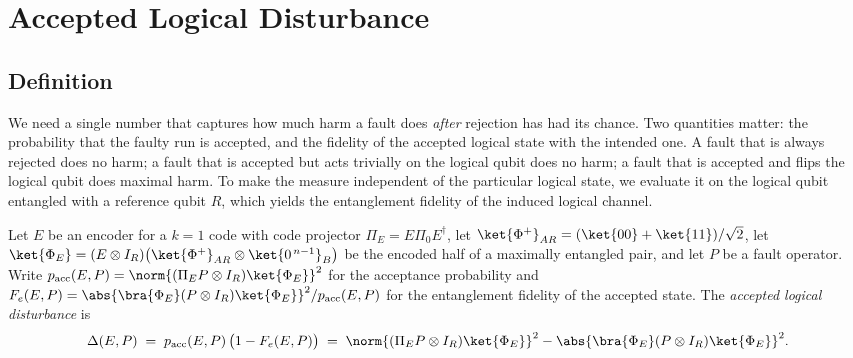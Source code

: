 \section{Accepted Logical Disturbance}\label{sec:qec:disturbance}

\subsection{Definition}\label{sec:qec:definition}

We need a single number that captures how much harm a fault does \emph{after} rejection has had its chance. Two quantities matter: the probability that the faulty run is accepted, and the fidelity of the accepted logical state with the intended one. A fault that is always rejected does no harm; a fault that is accepted but acts trivially on the logical qubit does no harm; a fault that is accepted and flips the logical qubit does maximal harm. To make the measure independent of the particular logical state, we evaluate it on the logical qubit entangled with a reference qubit $R$, which yields the entanglement fidelity of the induced logical channel.

\begin{definition}\label{def:qec:disturbance}
Let $E$ be an encoder for a $k=1$ code with code projector $\Pi_E=E\Pi_0E^{\dagger}$, let $\ket{\Phi^{+}}_{AR}=(\ket{00}+\ket{11})/\sqrt2$, let $\ket{\Phi_E}=(E\otimes I_R)\big(\ket{\Phi^{+}}_{AR}\otimes\ket{0^{\,n-1}}_B\big)$ be the encoded half of a maximally entangled pair, and let $P$ be a fault operator. Write $p_{\mathrm{acc}}(E,P)=\norm{(\Pi_E P\otimes I_R)\ket{\Phi_E}}^{2}$ for the acceptance probability and $F_e(E,P)=\abs{\bra{\Phi_E}(P\otimes I_R)\ket{\Phi_E}}^{2}/p_{\mathrm{acc}}(E,P)$ for the entanglement fidelity of the accepted state. The \emph{accepted logical disturbance} is
\begin{equation}\label{eq:qec:disturbance}
  \Delta(E,P)\;=\;p_{\mathrm{acc}}(E,P)\,\big(1-F_e(E,P)\big)
  \;=\;\norm{(\Pi_E P\otimes I_R)\ket{\Phi_E}}^{2}-\abs{\bra{\Phi_E}(P\otimes I_R)\ket{\Phi_E}}^{2}.
\end{equation}
\end{definition}


